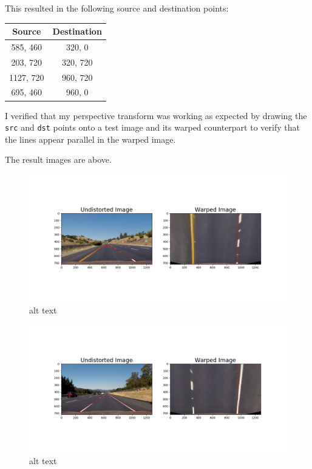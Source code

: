 \documentclass[11pt]{article}
\makeatletter
\def\maxwidth{\ifdim\Gin@nat@width>\linewidth\linewidth
    \else\Gin@nat@width\fi}
\let\Oldincludegraphics\includegraphics
\renewcommand{\includegraphics}[1]{\Oldincludegraphics[width=.8\maxwidth]{#1}}
\makeatother
\begin{document}
This resulted in the following source and destination points:

\begin{longtable}[]{@{}cc@{}}
\toprule
Source & Destination\tabularnewline
\midrule
\endhead
585, 460 & 320, 0\tabularnewline
203, 720 & 320, 720\tabularnewline
1127, 720 & 960, 720\tabularnewline
695, 460 & 960, 0\tabularnewline
\bottomrule
\end{longtable}

I verified that my perspective transform was working as expected by
drawing the \texttt{src} and \texttt{dst} points onto a test image and
its warped counterpart to verify that the lines appear parallel in the
warped image.

The result images are above.

\begin{figure}
\centering
\includegraphics{./output_images/3_transformed/straight_lines1.png}
\caption{alt text}
\end{figure}

\begin{figure}
\centering
\includegraphics{./output_images/3_transformed/straight_lines2.png}
\caption{alt text}
\end{figure}
\end{document}

